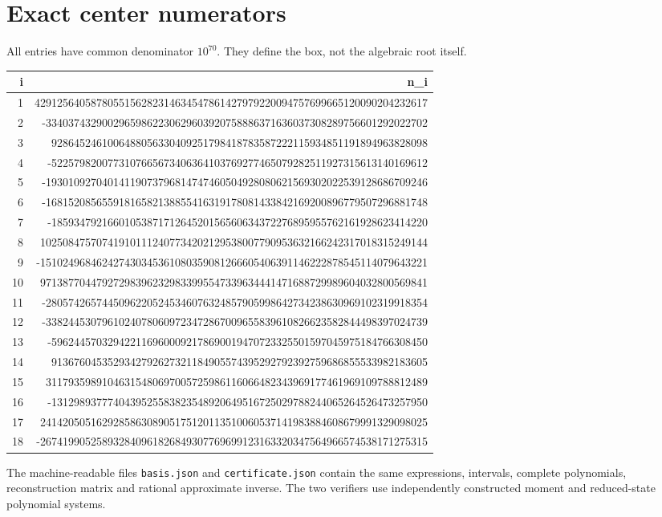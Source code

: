 \documentclass[11pt]{article}
\begin{document}
\appendix\section{Exact center numerators}
All entries have common denominator $10^{70}$. They define the box, not the
algebraic root itself.
{\scriptsize
\begin{longtable}{r|r}
i&n_i\\\hline
1 & 4291256405878055156282314634547861427979220094757699665120090204232617 \\
2 & -33403743290029659862230629603920758886371636037308289756601292022702 \\
3 & 9286452461006488056330409251798418783587222115934851191894963828098 \\
4 & -5225798200773107665673406364103769277465079282511927315613140169612 \\
5 & -19301092704014119073796814747460504928080621569302022539128686709246 \\
6 & -16815208565591816582138855416319178081433842169200896779507296881748 \\
7 & -1859347921660105387171264520156560634372276895955762161928623414220 \\
8 & 102508475707419101112407734202129538007790953632166242317018315249144 \\
9 & -151024968462427430345361080359081266605406391146222878545114079643221 \\
10 & 971387704479272983962329833995547339634441471688729989604032800569841 \\
11 & -28057426574450962205245346076324857905998642734238630969102319918354 \\
12 & -33824453079610240780609723472867009655839610826623582844498397024739 \\
13 & -5962445703294221169600092178690019470723325501597045975184766308450 \\
14 & 9136760453529342792627321184905574395292792392759686855533982183605 \\
15 & 31179359891046315480697005725986116066482343969177461969109788812489 \\
16 & -1312989377740439525583823548920649516725029788244065264526473257950 \\
17 & 241420505162928586308905175120113510060537141983884608679991329098025 \\
18 & -267419905258932840961826849307769699123163320347564966574538171275315 \\
\end{longtable}}
The machine-readable files \texttt{basis.json} and \texttt{certificate.json}
contain the same expressions, intervals, complete polynomials, reconstruction
matrix and rational approximate inverse. The two verifiers use independently
constructed moment and reduced-state polynomial systems.
\end{document}
